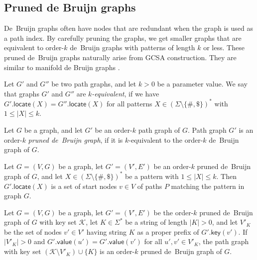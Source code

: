 \documentclass[a4paper,UKenglish]{lipics-v2016}
\newcommand{\set}[1]{\ensuremath{\{ #1 \}}}
\newcommand{\abs}[1]{\ensuremath{\lvert #1 \rvert}}
\newcommand{\locate}{\ensuremath{\mathsf{locate}}}
\newcommand{\gkey}{\ensuremath{\mathsf{key}}}
\newcommand{\gvalue}{\ensuremath{\mathsf{value}}}
\newcommand{\kequivalent}[1]{$#1$\nobreakdash-equivalent}
\newcommand{\orderk}[1]{order\nobreakdash-$#1$}
\newcommand{\patternset}{\ensuremath{(\Sigma \setminus \set{\#, \$})^{\ast}}}
\begin{document}
\subsection{Pruned de Bruijn graphs}

De~Bruijn graphs often have nodes that are redundant when the graph is used as a path index. By carefully pruning the graphs, we get smaller graphs that are equivalent to \orderk{k} de~Bruijn graphs with patterns of length $k$ or less. These pruned de~Bruijn graphs naturally arise from GCSA construction. They are similar to manifold de Bruijn graphs \cite{Lin2014}.

\begin{definition}
Let $G'$ and $G''$ be two path graphs, and let $k > 0$ be a parameter value. We say that graphs $G'$ and $G''$ are \emph{\kequivalent{k}}, if we have $G'.\locate(X) = G''.\locate(X)$ for all patterns $X \in \patternset$ with $1 \le \abs{X} \le k$.
\end{definition}

\begin{definition}
Let $G$ be a graph, and let $G'$ be an \orderk{k} path graph of $G$. Path graph $G'$ is an \orderk{k} \emph{pruned de~Bruijn graph}, if it is \kequivalent{k} to the \orderk{k} de~Bruijn graph of $G$.
\end{definition}

\begin{lemma}\label{lemma:dbg-fp}
Let $G = (V, G)$ be a graph, let $G' = (V', E')$ be an \orderk{k} pruned de~Bruijn graph of $G$, and let $X \in \patternset$ be a pattern with $1 \le \abs{X} \le k$. Then $G'.\locate(X)$ is a set of start nodes $v\in V$ of paths $P$ matching the pattern in graph $G$.
\end{lemma}

\begin{lemma}[Pruning]\label{lemma:dbg-prune}
Let $G = (V, G)$ be a graph, let $G' = (V', E')$ be the \orderk{k} pruned de~Bruijn graph of $G$ with key set $\mathcal{K}$, let $K \in \Sigma^{\ast}$ be a string of length $\abs{K} > 0$, and let $V'_{K}$ be the set of nodes $v' \in V'$ having string $K$ as a proper prefix of $G'.\gkey(v')$.
If $\abs{V'_{K}} > 0$ and $G'.\gvalue(u') = G'.\gvalue(v')$ for all $u', v' \in V'_{K}$, the path graph with key set $(\mathcal{K} \setminus V'_{K}) \cup \set{K}$ is an \orderk{k} pruned de~Bruijn graph of $G$.
\end{lemma}
\end{document}
